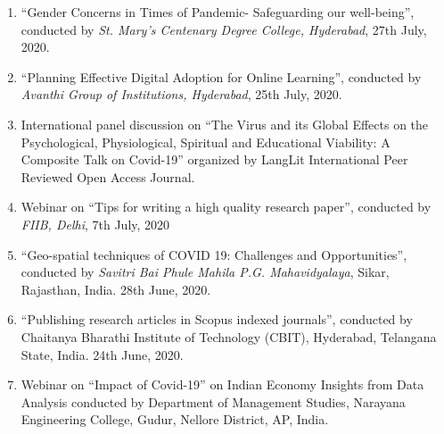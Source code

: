 \documentclass[10pt]{article}
\begin{document}
\begin{enumerate}
\item \enquote{Gender Concerns in Times of Pandemic- Safeguarding our well-being}, conducted by \emph{St. Mary’s Centenary Degree College, Hyderabad}, 27th July, 2020.

\item \enquote{Planning Effective Digital Adoption for Online Learning}, conducted by \emph{Avanthi Group of Institutions, Hyderabad}, 25th July, 2020.

\item International panel discussion on \enquote{The Virus and its Global Effects on the Psychological, Physiological, Spiritual and Educational Viability: A Composite Talk on Covid-19} organized by LangLit International Peer Reviewed Open Access Journal.

\item Webinar on \enquote{Tips for writing a high quality research paper}, conducted by \emph{FIIB, Delhi}, 7th July, 2020

\item \enquote{Geo-spatial techniques of COVID 19: Challenges and Opportunities}, conducted by \emph{Savitri Bai Phule Mahila P.G. Mahavidyalaya}, Sikar, Rajasthan, India. 28th June, 2020. 

\item \enquote{Publishing research articles in Scopus indexed journals}, conducted by Chaitanya Bharathi Institute of Technology (CBIT), Hyderabad, Telangana State, India. 24th June, 2020.

\item Webinar on \enquote{Impact of Covid-19} on Indian Economy Insights from Data Analysis conducted by Department of Management Studies, Narayana Engineering College, Gudur, Nellore District, AP, India.


\end{enumerate} 
\end{document}
